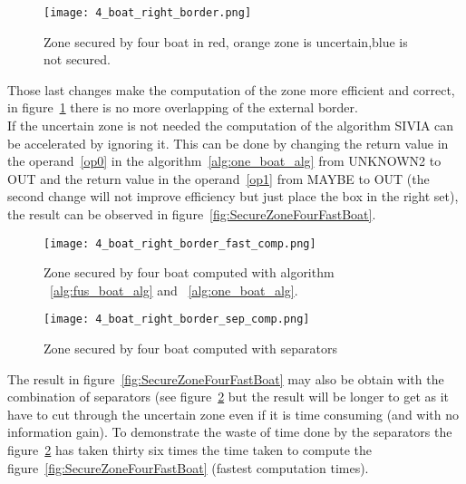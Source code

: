 \begin{figure}[H]
\centering
    \texttt{[image: 4\_boat\_right\_border.png]}
    \caption{Zone secured by four boat in red, orange zone is uncertain,blue is not secured.}
    \label{fig:SecureZoneFourBoat}
\end{figure}


Those last changes make the computation of the zone more efficient and correct, in figure~\ref{fig:SecureZoneFourBoat} there is no more overlapping of the external border.\\
If the uncertain zone is not needed the computation of the algorithm SIVIA can be accelerated by ignoring it. This can be done by changing the return value in the operand~\ref{op0} in the algorithm~\ref{alg:one_boat_alg} from UNKNOWN2 to OUT and the return value in the operand~\ref{op1} from MAYBE to OUT (the second change will not improve efficiency but just place the box in the right set), the result can be observed in figure~\ref{fig:SecureZoneFourFastBoat}.

\begin{figure}[H]
\centering
    \begin{minipage}[b]{0.4\textwidth}
    \texttt{[image: 4\_boat\_right\_border\_fast\_comp.png]}
    \caption{Zone secured by four boat computed with algorithm ~\ref{alg:fus_boat_alg} and ~\ref{alg:one_boat_alg}.}
    \label{fig:SecureZoneFourFastBoat}
    \end{minipage}
    \begin{minipage}[b]{0.4\textwidth}
    \texttt{[image: 4\_boat\_right\_border\_sep\_comp.png]}
    \caption{Zone secured by four boat computed with separators}
    \label{fig:SecureZoneFourSepBoat}
    \end{minipage}
\end{figure}

The result in figure~\ref{fig:SecureZoneFourFastBoat} may also be obtain with the combination of separators (see figure~\ref{fig:SecureZoneFourSepBoat} but the result will be longer to get as it have to cut through the uncertain zone even if it is time consuming (and with no information gain). To demonstrate the waste of time done by the separators the figure~\ref{fig:SecureZoneFourSepBoat} has taken thirty six times the time taken to compute the figure~\ref{fig:SecureZoneFourFastBoat} (fastest computation times).